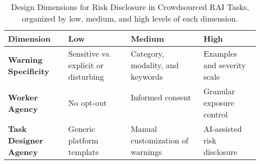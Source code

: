 \begin{table*}[t]
\centering
\begin{tabular}{p{3cm} p{4cm} p{4cm} p{4cm}}
\toprule
\textbf{Dimension} & \textbf{Low} & \textbf{Medium} & \textbf{High} \\
\midrule
\textbf{Warning Specificity} & 
Sensitive vs. explicit or disturbing ~\cite{prolific2025sensitive, bell2025warning} & 
Category, modality, and keywords ~\cite{jhaver2023personalizing, bridgland2024meta} & 
Examples and severity scale ~\cite{jhaver2023personalizing}\\
\midrule
\textbf{Worker Agency} & 
No opt-out ~\cite{MTurkTutorial2017} &
Informed consent ~\cite{silberman2018responsible, ProlificParticipantSensitive2025} & 
Granular exposure control ~\cite{jhaver2023personalizing, jhaver2022designing} \\
\midrule
\textbf{Task Designer Agency} & 
Generic platform template ~\cite{prolific2025sensitive, ProlificAPIContentWarning2025} & 
Manual customization of warnings ~\cite{qian2025locating}& 
AI-assisted risk disclosure ~\cite{qian2025aura} \\
\bottomrule
\end{tabular}
\caption{Design Dimensions for Risk Disclosure in Crowdsourced RAI Tasks, organized by low, medium, and high levels of each dimension.}
\label{tab:design_dimensions_levels}
\end{table*}







